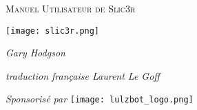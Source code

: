 \date {}
\thispagestyle{empty}
\begingroup
\centering 

\begin{center}
{\Huge \scshape Manuel Utilisateur de Slic3r}

\end{center}

\vspace{40mm}

\begin{center}
\texttt{[image: slic3r.png]}

\vspace{20mm}

{\large \itshape Gary Hodgson}

\vspace{7mm}

{\large \itshape traduction fran\c{c}aise  Laurent Le Goff}

\vspace{13mm}

{\large \itshape Sponsoris\'e par }
\texttt{[image: lulzbot\_logo.png]}

\end{center}
\endgroup

